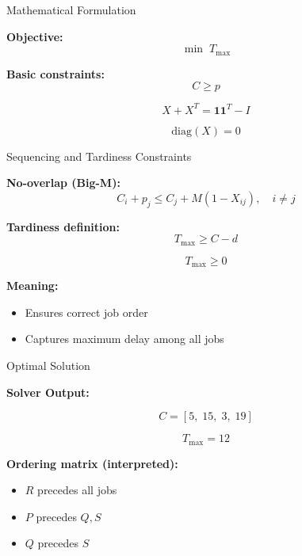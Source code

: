 \documentclass[12pt, aspectratio=169]{beamer}
\begin{document}
\begin{frame}{Mathematical Formulation}

\textbf{Objective:}
\[
\min \; T_{\max}
\]

\vspace{0.5em}

\textbf{Basic constraints:}
\[
C \ge p
\]

\[
X + X^T = \mathbf{1}\mathbf{1}^T - I
\]

\[
\mathrm{diag}(X) = 0
\]

\end{frame}

\begin{frame}{Sequencing and Tardiness Constraints}

\textbf{No-overlap (Big-M):}
\[
C_i + p_j \le C_j + M(1 - X_{ij}), \quad i \ne j
\]

\vspace{0.5em}

\textbf{Tardiness definition:}
\[
T_{\max} \ge C - d
\]

\[
T_{\max} \ge 0
\]

\vspace{0.5em}

\textbf{Meaning:}
\begin{itemize}
\item Ensures correct job order
\item Captures maximum delay among all jobs
\end{itemize}

\end{frame}

\begin{frame}{Optimal Solution}

\textbf{Solver Output:}

\vspace{0.5em}

\[
C = [5,\;15,\;3,\;19]
\]

\[
T_{\max} = 12
\]

\vspace{0.5em}

\textbf{Ordering matrix (interpreted):}

\begin{itemize}
\item $R$ precedes all jobs
\item $P$ precedes $Q, S$
\item $Q$ precedes $S$
\end{itemize}

\end{frame}
\end{document}
